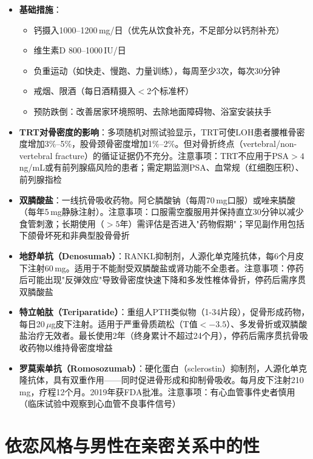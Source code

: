 \begin{itemize}[leftmargin=2cm]
	\item \textbf{基础措施}：
	\begin{itemize}
		\item 钙摄入1000--1200\,mg/日（优先从饮食补充，不足部分以钙剂补充）
		\item 维生素D 800--1000\,IU/日
		\item 负重运动（如快走、慢跑、力量训练），每周至少3次，每次30分钟
		\item 戒烟、限酒（每日酒精摄入$<$2个标准杯）
		\item 预防跌倒：改善居家环境照明、去除地面障碍物、浴室安装扶手
	\end{itemize}

	\item \textbf{TRT对骨密度的影响}：多项随机对照试验显示，TRT可使LOH患者腰椎骨密度增加3\%--5\%，股骨颈骨密度增加1\%--2\%。但对骨折终点（vertebral/non-vertebral fracture）的循证证据仍不充分。注意事项：TRT不应用于PSA$>4\,$ng/mL或有前列腺癌风险的患者；需定期监测PSA、血常规（红细胞压积）、前列腺指检

	\item \textbf{双膦酸盐}：一线抗骨吸收药物。阿仑膦酸钠（每周70\,mg口服）或唑来膦酸（每年5\,mg静脉注射）。注意事项：口服需空腹服用并保持直立30分钟以减少食管刺激；长期使用（$>5$年）需评估是否进入"药物假期"；罕见副作用包括下颌骨坏死和非典型股骨骨折

	\item \textbf{地舒单抗（Denosumab）}：RANKL抑制剂，人源化单克隆抗体，每6个月皮下注射60\,mg。适用于不能耐受双膦酸盐或肾功能不全患者。注意事项：停药后可能出现"反弹效应"导致骨密度快速下降和多发性椎体骨折，停药后需序贯双膦酸盐

	\item \textbf{特立帕肽（Teriparatide）}：重组人PTH类似物（1-34片段），促骨形成药物，每日20\,$\mu$g皮下注射。适用于严重骨质疏松（T值$< -3.5$）、多发骨折或双膦酸盐治疗无效者。最长使用2年（终身累计不超过24个月），停药后需序贯抗骨吸收药物以维持骨密度增益

	\item \textbf{罗莫索单抗（Romosozumab）}：硬化蛋白（sclerostin）抑制剂，人源化单克隆抗体，具有双重作用——同时促进骨形成和抑制骨吸收。每月皮下注射210\,mg，疗程12个月。2019年获FDA批准。注意事项：有心血管事件史者慎用（临床试验中观察到心血管不良事件信号）
\end{itemize}


\section{依恋风格与男性在亲密关系中的性}

